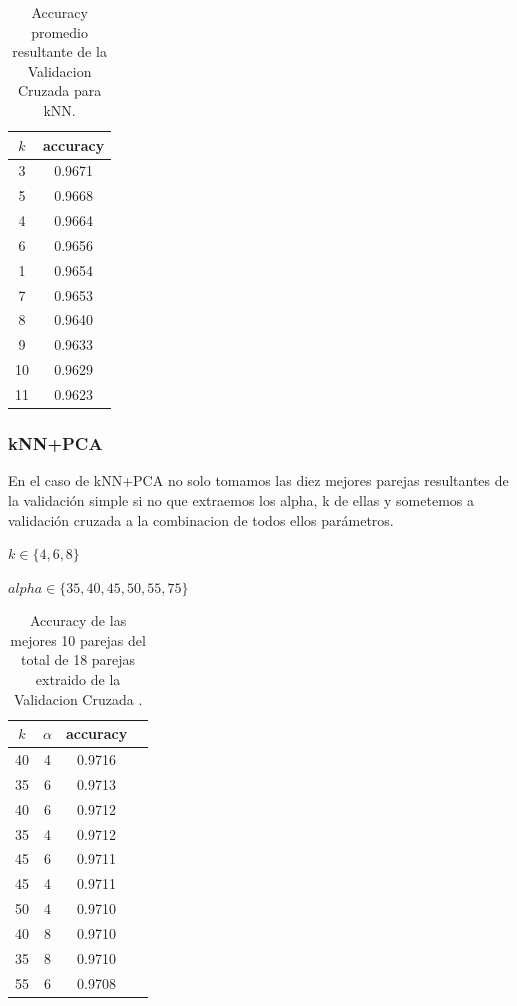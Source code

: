 \documentclass[a4paper,10pt]{article}
\begin{document}
\begin{table}[h!]
    \begin{center}
        \begin{tabular}{|c|c|}
        \hline
        \textbf{$k$} & \textbf{accuracy} \\
        \hline
        3 &  0.9671\\
        5 & 0.9668\\
        4 & 0.9664\\
        6 & 0.9656\\
        1 &  0.9654\\
        7 & 0.9653\\
        8 & 0.9640\\
        9 & 0.9633\\
        10 & 0.9629\\
        11 & 0.9623\\
        
        \hline
        \end{tabular}
        \caption{Accuracy promedio resultante de la Validacion Cruzada para kNN.}
        \label{knn_crossVal_table}
    \end{center}
\end{table}

\subsubsection{kNN+PCA}

En el caso de kNN+PCA  no solo tomamos las diez mejores parejas resultantes de la validación simple si no que extraemos los alpha, k de ellas y sometemos a validación cruzada a la combinacion de todos ellos parámetros.

$ k \in \{4,6,8\}$
\par
$alpha \in \{  35, 40, 45, 50, 55, 75 \}$
\begin{table}[h!]
    \begin{center}
        \begin{tabular}{|c|c|c|c|}
        \hline
        \textbf{$k$} & \textbf{$\alpha$} & \textbf{accuracy} \\
        \hline
        40 & 4 & 0.9716\\
        35 & 6 & 0.9713\\
        40 & 6 & 0.9712\\
        35 & 4 & 0.9712\\
        45 & 6 & 0.9711\\
        45 & 4 & 0.9711\\
        50 & 4 & 0.9710\\
        40 & 8 & 0.9710\\
        35 & 8 & 0.9710\\
        55 & 6 & 0.9708\\
        
        \hline
        \end{tabular}
        \caption{Accuracy de las mejores 10 parejas del total de 18 parejas extraido de la Validacion Cruzada .}
        \label{knnpca_crossVal_table}

    \end{center}
\end{table}
\end{document}
